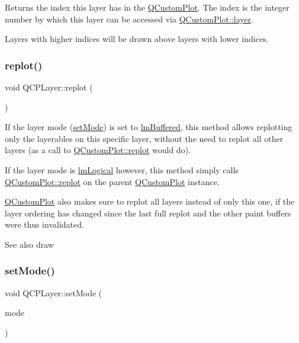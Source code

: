 Returns the index this layer has in the \hyperlink{class_q_custom_plot}{Q\+Custom\+Plot}. The index is the integer number by which this layer can be accessed via \hyperlink{class_q_custom_plot_a0a96244e7773b242ef23c32b7bdfb159}{Q\+Custom\+Plot\+::layer}.

Layers with higher indices will be drawn above layers with lower indices. \mbox{\label{class_q_c_p_layer_adefd53b6db02f470151c416f42e37180}} 
\subsubsection{\texorpdfstring{replot()}{replot()}}
{\footnotesize\ttfamily void Q\+C\+P\+Layer\+::replot (\begin{DoxyParamCaption}{ }\end{DoxyParamCaption})}

If the layer mode (\hyperlink{class_q_c_p_layer_a938d57b04f4e4c23cedf1711f983919b}{set\+Mode}) is set to \hyperlink{class_q_c_p_layer_a67dcfc1590be2a1f2227c5a39bb59c7cab581b9fab3007c4c65f057f4185d7538}{lm\+Buffered}, this method allows replotting only the layerables on this specific layer, without the need to replot all other layers (as a call to \hyperlink{class_q_custom_plot_aa4bfe7d70dbe67e81d877819b75ab9af}{Q\+Custom\+Plot\+::replot} would do).

If the layer mode is \hyperlink{class_q_c_p_layer_a67dcfc1590be2a1f2227c5a39bb59c7ca02eb5e9a4cb7f1baf1e2b6b99e3b87ce}{lm\+Logical} however, this method simply calls \hyperlink{class_q_custom_plot_aa4bfe7d70dbe67e81d877819b75ab9af}{Q\+Custom\+Plot\+::replot} on the parent \hyperlink{class_q_custom_plot}{Q\+Custom\+Plot} instance.

\hyperlink{class_q_custom_plot}{Q\+Custom\+Plot} also makes sure to replot all layers instead of only this one, if the layer ordering has changed since the last full replot and the other paint buffers were thus invalidated.

\begin{DoxySeeAlso}{See also}
draw 
\end{DoxySeeAlso}
\mbox{\label{class_q_c_p_layer_a938d57b04f4e4c23cedf1711f983919b}} 
\subsubsection{\texorpdfstring{set\+Mode()}{setMode()}}
{\footnotesize\ttfamily void Q\+C\+P\+Layer\+::set\+Mode (\begin{DoxyParamCaption}\item[{\hyperlink{class_q_c_p_layer_a67dcfc1590be2a1f2227c5a39bb59c7c}{Q\+C\+P\+Layer\+::\+Layer\+Mode}}]{mode }\end{DoxyParamCaption})}

